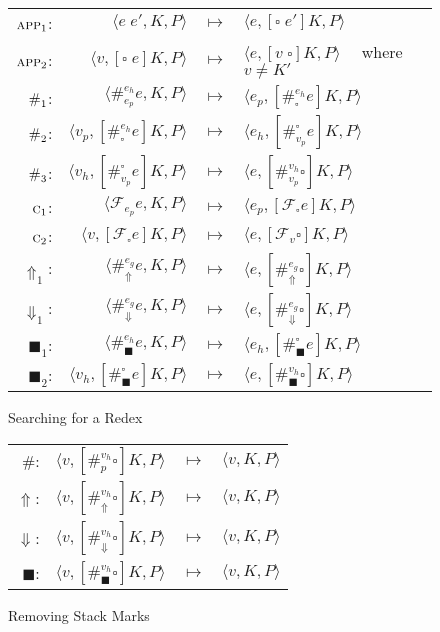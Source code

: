 \documentclass[11pt]{article}
\newcommand\F{\mathcal{F}}
\newcommand{\angles}[1]{\langle#1\rangle}
\begin{document}
\begin{figure}[H]
\caption{Searching for a Redex}
\label{fig:redexSearch}

\renewcommand{\arraystretch}{1.5}
\begin{tabular}{rrcl}
$\textsc{app}_1$: &
	$\angles{e\;e', K,P}$ & $\longmapsto$ &
	$\angles{e,[\square\;e']K,P}$ \\
$\textsc{app}_2$: &
	$\angles{v, [\square\;e]K,P}$ & $\longmapsto$ &
	$\angles{e,[v\;\square]K,P}\quad$ where $v \neq K'$ \\
$\textsc{\#}_1$: &
	$\angles{\#_{e_p}^{e_h}e, K, P}$ & $\longmapsto$ &
	$\angles{e_p,[\#_{\square}^{e_h}e]K, P}$ \\
$\textsc{\#}_2$: &
	$\angles{v_p, [\#_{\square}^{e_h}e]K, P}$ & $\longmapsto$ &
	$\angles{e_h,[\#_{v_p}^{\square}e]K, P}$ \\
$\textsc{\#}_3$: &
	$\angles{v_h, [\#_{v_p}^{\square}e]K, P}$ & $\longmapsto$ &
	$\angles{e,[\#_{v_p}^{v_h}\square]K, P}$ \\
$\textsc{c}_1$: &
	$\angles{\F_{e_p}e, K, P}$ & $\longmapsto$ &
	$\angles{e_p, [\F_\square e]K,P}$ \\
$\textsc{c}_2$: &
	$\angles{v, [\F_\square e]K, P}$ & $\longmapsto$ &
	$\angles{e, [\F_v \square]K, P}$ \\
$\Uparrow_1$: &
	$\angles{\#_\Uparrow^{e_g}e, K, P}$ & $\longmapsto$ &
	$\angles{e,[\#_\Uparrow^{e_g}\square]K, P}$ \\
$\Downarrow_1$: &
	$\angles{\#_\Downarrow^{e_g}e, K, P}$ & $\longmapsto$ &
	$\angles{e,[\#_\Downarrow^{e_g}\square]K, P}$ \\
$\blacksquare_1$: &
	$\angles{\#_\blacksquare^{e_h}e, K, P}$ & $\longmapsto$ &
	$\angles{e_h,[\#_\blacksquare^{\square}e]K, P}$ \\
$\blacksquare_2$: &
	$\angles{v_h, [\#_\blacksquare^{\square}e]K, P}$ & $\longmapsto$ &
	$\angles{e,[\#_\blacksquare^{v_h}\square]K, P}$ \\
\end{tabular}
\end{figure}

\begin{figure}[H]
\caption{Removing Stack Marks}
\label{fig:remove-stack-marks}

\renewcommand{\arraystretch}{1.5}
\begin{tabular}{rrcl}
$\#$: &
	$\angles{v, [\#_p^{v_h}\square]K, P}$ & $\longmapsto$ &
	$\angles{v, K, P}$ \\
$\Uparrow$: &
	$\angles{v, [\#_\Uparrow^{v_h}\square]K, P}$ & $\longmapsto$ &
	$\angles{v, K, P}$ \\
$\Downarrow$: &
	$\angles{v, [\#_\Downarrow^{v_h}\square]K, P}$ & $\longmapsto$ &
	$\angles{v, K, P}$ \\
$\blacksquare$: &
	$\angles{v, [\#_\blacksquare^{v_h}\square]K, P}$ & $\longmapsto$ &
	$\angles{v, K, P}$ \\
\end{tabular}
\end{figure}
\end{document}

